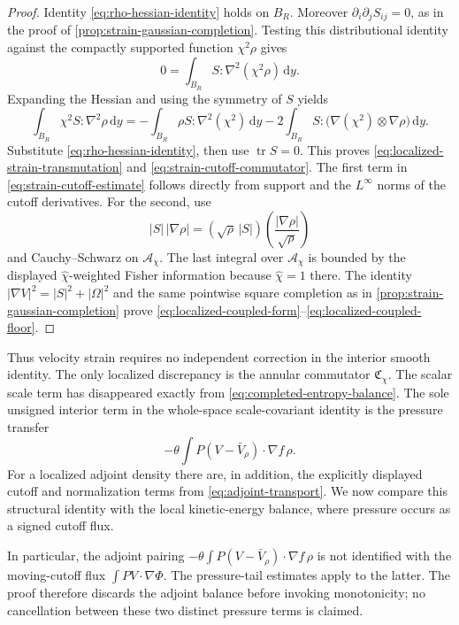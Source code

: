 \documentclass[11pt]{amsart}
\numberwithin{equation}{section}
\theoremstyle{plain}
\theoremstyle{definition}
\theoremstyle{remark}
\newcommand{\dd}{\,\mathrm d}
\begin{document}
\begin{proof}
Identity \eqref{eq:rho-hessian-identity} holds on \(B_R\).  Moreover
\(\partial_i\partial_jS_{ij}=0\), as in the proof of
\cref{prop:strain-gaussian-completion}.  Testing this distributional identity
against the compactly supported function \(\chi^2\rho\) gives
\[
 0=\int_{B_R}S:\nabla^2(\chi^2\rho)\dd y.
\]
Expanding the Hessian and using the symmetry of \(S\) yields
\[
 \int_{B_R}\chi^2S:\nabla^2\rho\dd y
 =-\int_{B_R}\rho S:\nabla^2(\chi^2)\dd y
  -2\int_{B_R}S:
       \bigl(\nabla(\chi^2)\otimes\nabla\rho\bigr)\dd y.
\]
Substitute \eqref{eq:rho-hessian-identity}, then use
\(\operatorname{tr}S=0\).  This proves
\eqref{eq:localized-strain-transmutation} and
\eqref{eq:strain-cutoff-commutator}.  The first term in
\eqref{eq:strain-cutoff-estimate} follows directly from support and the
\(L^\infty\) norms of the cutoff derivatives.  For the second, use
\[
 |S|\,|\nabla\rho|
 =(\sqrt\rho\,|S|)
   \left(\frac{|\nabla\rho|}{\sqrt\rho}\right)
\]
and Cauchy--Schwarz on \(\mathcal A_\chi\).
The last integral over \(\mathcal A_\chi\) is bounded by the displayed
\(\widehat\chi\)-weighted Fisher information because
\(\widehat\chi=1\) there.
The identity
\(|\nabla V|^2=|S|^2+|\Omega|^2\) and the same pointwise square completion
as in \cref{prop:strain-gaussian-completion} prove
\eqref{eq:localized-coupled-form}--\eqref{eq:localized-coupled-floor}.
\end{proof}

Thus velocity strain requires no independent correction in the interior
smooth identity.  The only localized discrepancy is the annular commutator
\(\mathfrak C_\chi\).  The scalar scale term has disappeared exactly from
\eqref{eq:completed-entropy-balance}.  The sole unsigned interior term in the
whole-space scale-covariant identity is the pressure transfer
\[
 -\theta\int P(V-\bar V_\rho)\cdot\nabla f\,\rho.
\]
For a localized adjoint density there are, in addition, the explicitly
displayed cutoff and normalization terms from
\eqref{eq:adjoint-transport}.  We now compare this structural identity with
the local kinetic-energy balance, where pressure occurs as a signed cutoff
flux.

In particular, the adjoint pairing
\(-\theta\int P(V-\bar V_\rho)\cdot\nabla f\,\rho\) is not identified with the moving-cutoff
flux \(\int PV\cdot\nabla\Phi\).  The pressure-tail estimates apply to the
latter.  The proof therefore discards the adjoint balance before invoking
monotonicity; no cancellation between these two distinct pressure terms is
claimed.
\end{document}
